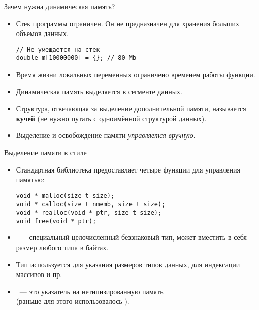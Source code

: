 \documentclass{beamer}
\begin{document}
\begin{frame}[fragile]{Зачем нужна динамическая память?}
    \begin{itemize}
        \item Стек программы ограничен. Он не предназначен
            для хранения больших объемов данных.
\begin{lstlisting}
// Не умещается на стек
double m[10000000] = {}; // 80 Mb
\end{lstlisting}
        \item Время жизни локальных переменных ограничено
            временем работы функции.
        \item Динамическая память выделяется в сегменте данных.
        \item Структура, отвечающая за выделение дополнительной
            памяти, называется {\bf кучей} (не нужно путать
            с одноимённой структурой данных).
        \item Выделение и освобождение памяти {\em управляется вручную}.
    \end{itemize}
\end{frame}

\begin{frame}[fragile]{Выделение памяти в стиле \langc}
    \begin{itemize}
        \item Стандартная библиотека 
            предоставляет четыре функции для управления памятью:
            {\small
            \begin{lstlisting}
void * malloc(size_t size);
void * calloc(size_t nmemb, size_t size);
void * realloc(void * ptr, size_t size);
void free(void * ptr);
            \end{lstlisting}}
        \item {}~--- специальный целочисленный беззнаковый тип, 
            может вместить в себя размер любого типа в байтах.
        \item Тип  используется для указания размеров типов данных,
            для индексации массивов и пр.
        \item {}~--- это указатель на нетипизированную память\\
            (раньше для этого использовалось ).
    \end{itemize}
\end{frame}
\end{document}
